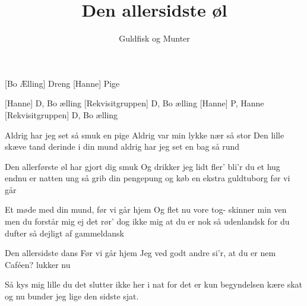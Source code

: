 \documentclass[a4paper,11pt]{article}
\title{Den allersidste øl}
\author{Guldfisk og Munter}
\begin{document}
\maketitle

\begin{roles}  
[Bo Ælling] Dreng
[Hanne] Pige
\end{roles}

\begin{roles}  
[Hanne] D, Bo ælling
[Rekvisitgruppen] D, Bo ælling
[Hanne] P, Hanne
[Rekvisitgruppen] D, Bo ælling
\end{roles}

\begin{song}

 Aldrig har jeg set så smuk en pige
Aldrig var min lykke nær så stor
Den lille skæve tand
derinde i din mund
aldrig har jeg set en bag så rund

 Den allerførste øl
har gjort dig smuk
Og drikker jeg lidt fler'
bli'r du et hug
endnu er natten ung
så grib din pengepung
og køb en ekstra
guldtuborg
før vi går

 Et møde med din mund,
før vi går hjem
Og flet nu vore tog-
skinner min ven
men du forstår mig ej
det rør' dog ikke mig
at du er nok så udenlandsk
for du dufter så dejligt af gammeldansk


 Den allersidste dans
Før vi går hjem
Jeg ved godt andre si'r,
at du er nem
Caféen? lukker nu


 Så kys mig lille du
det slutter ikke her i nat
for det er kun begyndelsen kære skat
og nu bunder jeg lige den sidste sjat. 


\end{song}
\end{document}
